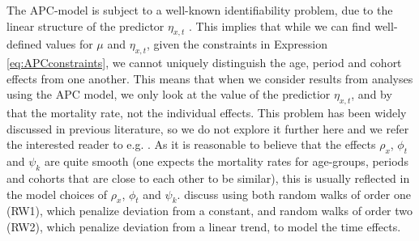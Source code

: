 \newpar The APC-model is subject to a well-known identifiability problem, due to the linear structure of the predictor $\eta_{x,t}$ \parencite{RieblerThesis2010}. This implies that while we can find well-defined values for $\mu$ and $\eta_{x,t}$, given the constraints in Expression \ref{eq:APCconstraints}, we cannot uniquely distinguish the age, period and cohort effects from one another. This means that when we consider results from analyses using the APC model, we only look at the value of the predictior $\eta_{x,t}$, and by that the mortality rate, not the individual effects. This problem has been widely discussed in previous literature, so we do not explore it further here and we refer the interested reader to e.g. \textcite{RieblerThesis2010}. 
\newpar As it is reasonable to believe that the effects $\rho_x$, $\phi_t$ and $\psi_k$ are quite smooth (one expects the mortality rates for age-groups, periods and cohorts that are close to each other to be similar), this is usually reflected in the model choices of $\rho_x$, $\phi_t$ and $\psi_k$. \textcite{RieblerThesis2010} discuss using both random walks of order one (RW1), which penalize deviation from a constant, and random walks of order two (RW2), which penalize deviation from a linear trend, to model the time effects.


